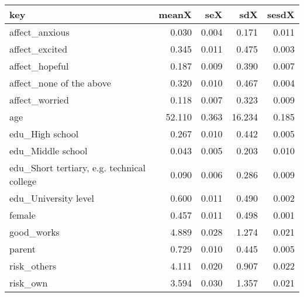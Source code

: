 \begin{table}[t]
\fontsize{12.0pt}{14.4pt}\selectfont
\begin{tabular*}{\linewidth}{@{\extracolsep{\fill}}lrrrr}
\toprule
key & meanX & seX & sdX & sesdX \\ 
\midrule\addlinespace[2.5pt]
affect\_anxious & 0.030 & 0.004 & 0.171 & 0.011 \\ 
affect\_excited & 0.345 & 0.011 & 0.475 & 0.003 \\ 
affect\_hopeful & 0.187 & 0.009 & 0.390 & 0.007 \\ 
affect\_none of the above & 0.320 & 0.010 & 0.467 & 0.004 \\ 
affect\_worried & 0.118 & 0.007 & 0.323 & 0.009 \\ 
age & 52.110 & 0.363 & 16.234 & 0.185 \\ 
edu\_High school & 0.267 & 0.010 & 0.442 & 0.005 \\ 
edu\_Middle school & 0.043 & 0.005 & 0.203 & 0.010 \\ 
edu\_Short tertiary, e.g. technical college & 0.090 & 0.006 & 0.286 & 0.009 \\ 
edu\_University level & 0.600 & 0.011 & 0.490 & 0.002 \\ 
female & 0.457 & 0.011 & 0.498 & 0.001 \\ 
good\_works & 4.889 & 0.028 & 1.274 & 0.021 \\ 
parent & 0.729 & 0.010 & 0.445 & 0.005 \\ 
risk\_others & 4.111 & 0.020 & 0.907 & 0.022 \\ 
risk\_own & 3.594 & 0.030 & 1.357 & 0.021 \\ 
\bottomrule
\end{tabular*}
\end{table}

